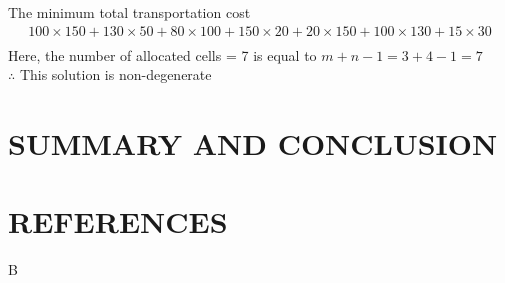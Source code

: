 \documentclass[12pt]{report}
\newcommand{\NI}{\noindent}
\begin{document}
	\NI The minimum total transportation cost
	\begin{gather*}
		100 \times 150 + 130 \times 50 + 80 \times 100 + 150 \times 20 + 20 \times 150 + 100 \times 130 + 15 \times 30 \\[-1cm]
	\end{gather*}
	Here, the number of allocated cells = 7 is equal to $m+n-1 = 3+4-1 = 7$\\
	$\therefore$ This solution is non-degenerate
	
	
	\chapter{SUMMARY AND CONCLUSION}
	

	
	\chapter*{REFERENCES}
	
	\begin{description}
		\item B
	\end{description}
	
	
	
	
	
	
	
	
	
	
	
	
	
	
	
	
	
	
	
	
	
	
	
	
	
	
	
	
	
	
	
	
	
	
	
	
	
	
	
	
	
	
	
	
\end{document}
